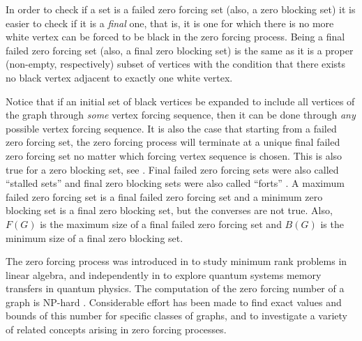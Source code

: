 \documentclass[preprint,12pt]{elsarticle}
\begin{document}
In order to check if a set is a failed zero forcing set (also, a zero blocking set)
it is easier to check if it is a {\em final} one,
that is, it is one for which there is no more white vertex can be forced to be black in the zero forcing process.
Being a final failed zero forcing set (also, a final zero blocking set)
is the same as it is a proper (non-empty, respectively) subset of vertices with the condition
that there exists no black vertex adjacent to exactly one white vertex. 

Notice that if an initial set of black vertices be expanded to include all vertices of the graph
through {\em some} vertex forcing sequence, then it can be done through {\em any} possible vertex forcing sequence.
It is also the case that starting from a failed zero forcing set,
the zero forcing process will terminate at a unique final failed zero forcing set
no matter which forcing vertex sequence is chosen.
This is also true for a zero blocking set, see \cite{2008a}.
Final failed zero forcing sets were also called ``stalled sets'' \cite{2015fjs,2017s}
and final zero blocking sets were also called ``forts'' \cite{2017f}.
A maximum failed zero forcing set is a final failed zero forcing set
and a minimum zero blocking set is a final zero blocking set,
but the converses are not true.
Also, $F(G)$ is the maximum size of a final failed zero forcing set
and $B(G)$ is the minimum size of a final zero blocking set.

The zero forcing process was introduced in \cite{2008AIM} to study minimum rank problems in linear algebra,
and independently in \cite{2007bg} to explore quantum systems memory transfers in quantum physics.
The computation of the zero forcing number of a graph is NP-hard \cite{2008a}.
Considerable effort has been made to find exact values and bounds of this
number for specific classes of graphs, and to investigate a variety of related concepts arising in zero forcing processes.
\end{document}
